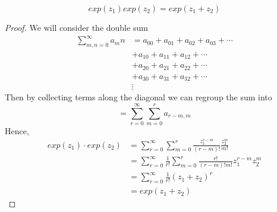 \documentclass{article}
\numberwithin{equation}{section}
\begin{document}
\begin{prop}[Multiplication]
    \[
        exp(z_1)exp(z_2) = exp(z_1 + z_2)  
    \]
\end{prop}
\begin{proof}
    We will consider the double sum
    \begin{align*}
        \sum_{m,n=0}^{\infty}{a_mn} &= a_{00} + a_{01} + a_{02} + a_{03} + \cdots \\
         &+ a_{10} + a_{11} + a_{12} + \cdots \\
         &+ a_{20} + a_{21} + a_{22} + \cdots \\
         &+ a_{30} + a_{31} + a_{32} + \cdots \\
         &\vdots
    \end{align*}
    Then by collecting terms along the diagonal we can regroup the sum into
    \[
        =\sum_{r=0}^{\infty}\sum_{m=0}^{r}{a_{r-m, m}}
    \]
    Hence, 
    \begin{align*}
        exp(z_1) \cdot exp(z_2) &= \sum_{r=0}^{\infty}\sum_{m=0}^{r}{\frac{z_1^{r-m}}{(r-m)!}\frac{z_2^{m}}{m!}} \\
        &= \sum_{r=0}^{\infty}{\frac{1}{r!}}\sum_{m=0}^{r}{\frac{r!}{(r-m)!m!}z_1^{r-m}z_2^{m}} \\
        &= \sum_{r=0}^{\infty}{\frac{1}{r!} (z_1 + z_2)^r} \\
        &= exp(z_1 + z_2)
    \end{align*}
\end{proof}

\end{document}
